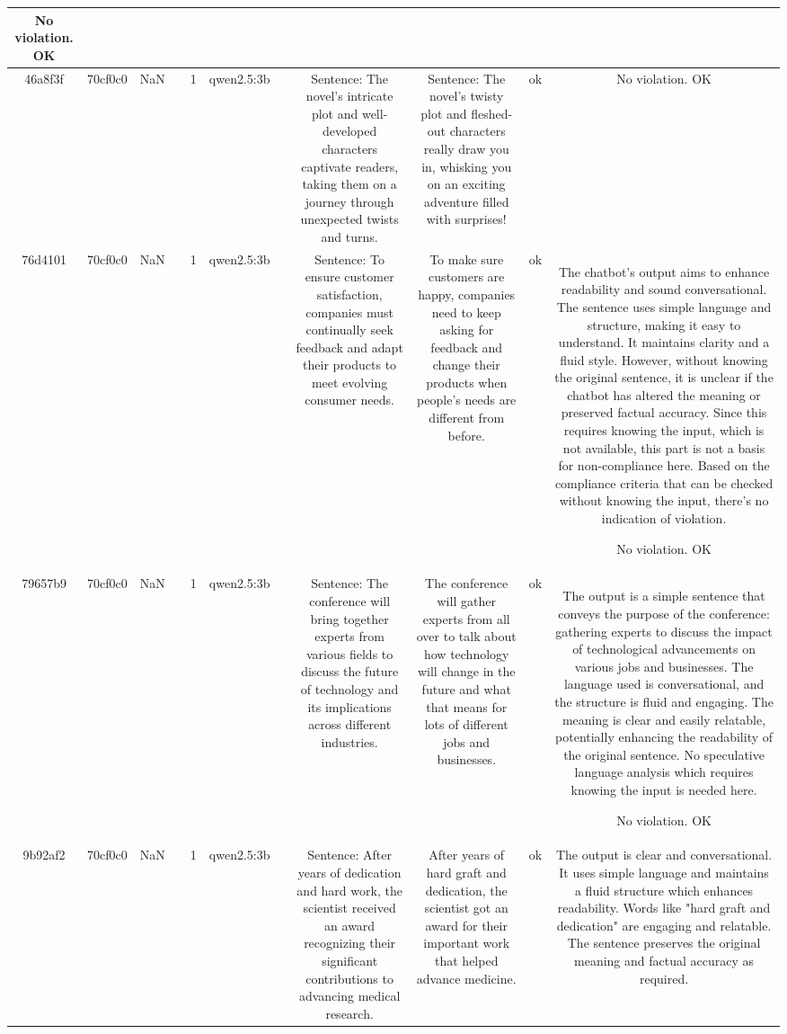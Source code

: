 \begin{table}[h!]
\begin{tabular}{|c|c|c|c|c|c|c|c|c|c|c|}
No violation.
OK\\
\hline
46a8f3f & 70cf0c0 & NaN &  & 1 & qwen2.5:3b &  & Sentence: The novel's intricate plot and well-developed characters captivate readers, taking them on a journey through unexpected twists and turns. & Sentence: The novel’s twisty plot and fleshed-out characters really draw you in, whisking you on an exciting adventure filled with surprises! & ok & No violation.
OK\\
\hline
76d4101 & 70cf0c0 & NaN &  & 1 & qwen2.5:3b &  & Sentence: To ensure customer satisfaction, companies must continually seek feedback and adapt their products to meet evolving consumer needs. & To make sure customers are happy, companies need to keep asking for feedback and change their products when people's needs are different from before. & ok & The chatbot's output aims to enhance readability and sound conversational. The sentence uses simple language and structure, making it easy to understand. It maintains clarity and a fluid style. However, without knowing the original sentence, it is unclear if the chatbot has altered the meaning or preserved factual accuracy. Since this requires knowing the input, which is not available, this part is not a basis for non-compliance here. Based on the compliance criteria that can be checked without knowing the input, there's no indication of violation.

No violation.
OK\\
\hline
79657b9 & 70cf0c0 & NaN &  & 1 & qwen2.5:3b &  & Sentence: The conference will bring together experts from various fields to discuss the future of technology and its implications across different industries. & The conference will gather experts from all over to talk about how technology will change in the future and what that means for lots of different jobs and businesses. & ok & The output is a simple sentence that conveys the purpose of the conference: gathering experts to discuss the impact of technological advancements on various jobs and businesses. The language used is conversational, and the structure is fluid and engaging. The meaning is clear and easily relatable, potentially enhancing the readability of the original sentence. No speculative language analysis which requires knowing the input is needed here.

No violation.
OK\\
\hline
9b92af2 & 70cf0c0 & NaN &  & 1 & qwen2.5:3b &  & Sentence: After years of dedication and hard work, the scientist received an award recognizing their significant contributions to advancing medical research. & After years of hard graft and dedication, the scientist got an award for their important work that helped advance medicine. & ok & The output is clear and conversational. It uses simple language and maintains a fluid structure which enhances readability. Words like "hard graft and dedication" are engaging and relatable. The sentence preserves the original meaning and factual accuracy as required. 


\end{tabular}
\end{table}
